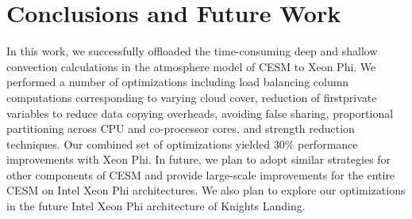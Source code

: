 \section{Conclusions and Future Work}
\label{con_fut}

In this work, we successfully offloaded the time-consuming deep and shallow convection calculations in the atmosphere model of CESM to Xeon Phi. We performed a number of optimizations including load balancing column computations corresponding to varying cloud cover, reduction of firstprivate variables to reduce data copying overheads, avoiding false sharing, proportional partitioning across CPU and co-processor cores, and strength reduction techniques. Our combined set of optimizations yielded 30\% performance improvements with Xeon Phi. In future, we plan to adopt similar strategies for other components of CESM and provide large-scale improvements for the entire CESM on Intel Xeon Phi architectures.
We also plan to explore our optimizations in the future Intel Xeon Phi architecture of Knights Landing.

